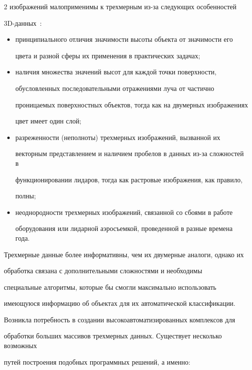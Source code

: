 \begin{multicols}{2}
изображений малоприменимы к трехмерным из-за следующих особенностей 

3D-данных~\cite{7su}:

   \begin{itemize}

\item принципиального отличия значимости высоты объекта от значимости его 

цвета и разной сферы их применения в практических задачах;

\item наличия множества значений высот для каждой точки поверхности, 

обусловленных последовательными отражениями луча от частично 

проницаемых поверхностных объектов, тогда как на двумерных изображениях 

цвет имеет один слой;

\item разреженности (неполноты) трехмерных изоб\-ра\-же\-ний, вызванной их 

векторным пред\-став\-ле\-ни\-ем и наличием пробелов в данных из-за сложностей в 

функционировании лидаров, тогда как растровые изображения, как правило, 

полны;

\item неоднородности трехмерных изображений, связанной со сбоями в работе 

оборудования или лидарной аэросъемкой, проведенной в разные времена года.

\end{itemize}



Трехмерные данные более информативны, чем их двумерные аналоги, однако их 

обработка связана с дополнительными сложностями и необходимы 

специальные алгоритмы, которые бы смогли максимально использовать 

имеющуюся информацию об объектах для их автоматической классификации. 

Возникла потребность в создании высокоавтоматизированных комплексов для 

обработки больших массивов трехмерных данных. Существует несколько возможных 

путей построения подобных программных решений, а именно:

   \begin{enumerate}[(1)]


\end{enumerate}
\end{multicols}
